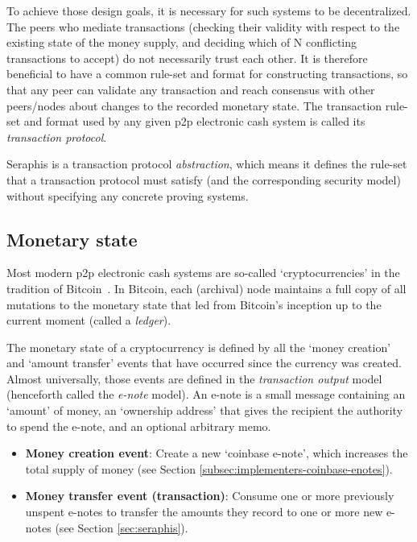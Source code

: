 To achieve those design goals, it is necessary for such systems to be decentralized. The peers who mediate transactions (checking their validity with respect to the existing state of the money supply, and deciding which of N conflicting transactions to accept) do not necessarily trust each other. It is therefore beneficial to have a common rule-set and format for constructing transactions, so that any peer can validate any transaction and reach consensus with other peers/nodes about changes to the recorded monetary state. The transaction rule-set and format used by any given p2p electronic cash system is called its {\em transaction protocol}.

Seraphis is a transaction protocol {\em abstraction}, which means it defines the rule-set that a transaction protocol must satisfy (and the corresponding security model) without specifying any concrete proving systems.


\subsection{Monetary state}
\label{subsec:intro-monetary-state}

Most modern p2p electronic cash systems are so-called `cryptocurrencies' in the tradition of Bitcoin~\cite{Nakamoto_bitcoin}. In Bitcoin, each (archival) node maintains a full copy of all mutations to the monetary state that led from Bitcoin's inception up to the current moment (called a {\em ledger}).

The monetary state of a cryptocurrency is defined by all the `money creation' and `amount transfer' events that have occurred since the currency was created. Almost universally, those events are defined in the {\em transaction output} model (henceforth called the {\em e-note} model). An e-note is a small message containing an `amount' of money, an `ownership address' that gives the recipient the authority to spend the e-note, and an optional arbitrary memo.

\begin{itemize}
    \item \textbf{Money creation event}: Create a new `coinbase e-note', which increases the total supply of money (see Section \ref{subsec:implementers-coinbase-enotes}).
    \item \textbf{Money transfer event (transaction)}: Consume one or more previously unspent e-notes to transfer the amounts they record to one or more new e-notes (see Section \ref{sec:seraphis}).
\end{itemize}

